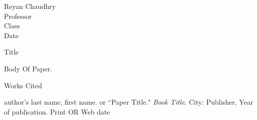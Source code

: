 \documentclass[12pt]{article}
\newcommand{\bibent}{\noindent \hangindent 40pt}
\newenvironment{workscited}{\newpage \begin{center} Works Cited \end{center}}{\newpage }
\begin{document}
\begin{flushleft}

Reyan Chaudhry\\
Professor\\ 
Class \\ 
Date\\

\begin{center}
Title
\end{center}

\setlength{\parindent}{0.5in} 

Body Of Paper.

\begin{workscited}

\bibent
author's last name, first name.  or ``Paper Title."  \textit{Book Title}.  City: Publisher, Year of publication. Print OR Web date

\end{workscited}

\end{flushleft}
\end{document}
